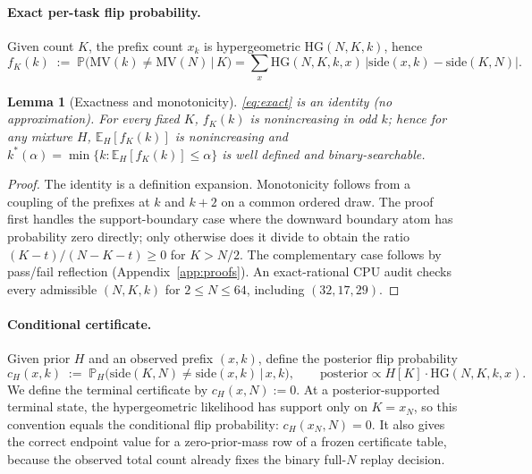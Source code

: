 \documentclass{article}
\newtheorem{lemma}{Lemma}
\theoremstyle{definition}
\theoremstyle{remark}
\newcommand{\cert}{c_H}
\newcommand{\HG}{\mathrm{HG}}
\newcommand{\MV}{\mathrm{MV}}
\newcommand{\E}{\mathbb{E}}
\renewcommand{\P}{\mathbb{P}}
\begin{document}
\paragraph{Exact per-task flip probability.}
Given count $K$, the prefix count $x_k$ is hypergeometric
$\HG(N,K,k)$, hence
\begin{equation}
f_K(k) \;:=\; \P\big(\MV(k)\neq\MV(N)\,\big|\,K\big)
= \sum_{x}\HG(N,K,k,x)\,\big|\mathrm{side}(x,k)-\mathrm{side}(K,N)\big|.
\label{eq:exact}
\end{equation}

\begin{lemma}[Exactness and monotonicity]
\label{lem:exact}
\eqref{eq:exact} is an identity (no approximation). For every fixed $K$,
$f_K(k)$ is nonincreasing in odd $k$; hence for any mixture $H$,
$\E_H[f_K(k)]$ is nonincreasing and
$k^*(\alpha)=\min\{k:\E_H[f_K(k)]\le\alpha\}$ is well defined and
binary-searchable.
\end{lemma}
\begin{proof}
The identity is a definition expansion. Monotonicity follows from a
coupling of the prefixes at $k$ and $k{+}2$ on a common ordered draw.  The
proof first handles the support-boundary case where the downward boundary atom
has probability zero directly; only otherwise does it divide to obtain the
ratio $(K-t)/(N-K-t)\ge0$ for $K>N/2$. The complementary case follows by
pass/fail reflection (Appendix~\ref{app:proofs}). An exact-rational CPU audit
checks every admissible $(N,K,k)$ for $2\le N\le64$, including
$(32,17,29)$.
\end{proof}

\paragraph{Conditional certificate.}
Given prior $H$ and an observed prefix $(x,k)$, define the posterior flip
probability
\begin{equation}
\cert(x,k) \;:=\; \P_H\big(\mathrm{side}(K,N)\neq\mathrm{side}(x,k)\,\big|\,x,k\big),
\qquad \text{posterior} \propto H[K]\cdot\HG(N,K,k,x).
\label{eq:cond}
\end{equation}
We define the terminal certificate by $\cert(x,N):=0$. At a
posterior-supported terminal state, the hypergeometric likelihood has support
only on $K=x_N$, so this convention equals the conditional flip probability:
$\cert(x_N,N)=0$. It also gives the correct endpoint value for a
zero-prior-mass row of a frozen certificate table, because the observed total
count already fixes the binary full-$N$ replay decision.
\end{document}

